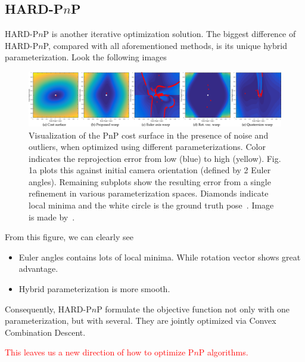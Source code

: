 \documentclass[a4paper]{article}
\begin{document}
\subsection{HARD-P$n$P}
HARD-P$n$P is another iterative optimization solution. The biggest difference of HARD-P$n$P, compared with all aforementioned methods, is its unique hybrid parameterization. Look the following images

\begin{figure}
\centering
\includegraphics[scale=0.14]{hand_eye_files/vision/figures/hadfi1-2806446-hires.png}
\caption{Visualization of the PnP cost surface in the presence of noise and outliers, when optimized using different parameterizations. Color indicates the reprojection error from low (blue) to high (yellow). Fig. 1a plots this against initial camera orientation (defined by 2 Euler angles). Remaining subplots show the resulting error from a single refinement in various parameterization spaces. Diamonds indicate local minima and the white circle is the ground truth pose~\cite{8292943}. Image is made by~\cite{8292943}.}
\end{figure}
From this figure, we can clearly see
\begin{itemize}
\item Euler angles contains lots of local minima. While rotation vector shows great advantage.
\item Hybrid parameterization is more smooth.
\end{itemize}
Consequently, HARD-P$n$P formulate the objective function not only with one parameterization, but with several. They are jointly optimized via Convex Combination Descent. 

\textcolor{red}{This leaves us a new direction of how to optimize P$n$P algorithms.}


 

\end{document}

